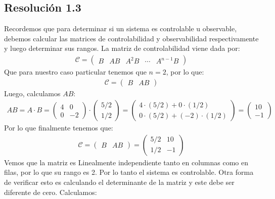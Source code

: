 \documentclass[
  11pt,
  letterpaper,
   addpoints,
   answers
  ]{exam}
\begin{document}
\begin{questions}
\begin{solution}
  \subsection*{Resolución 1.3}
Recordemos que para determinar si un sistema es controlable u observable, debemos calcular las matrices de controlabilidad y observabilidad respectivamente y luego determinar sus rangos. La matriz de controlabilidad viene dada por:
\begin{align}
  \mathcal C = \begin{pmatrix} B & AB & A^2B & \cdots & A^{n-1}B \end{pmatrix}
\end{align}
Que para nuestro caso particular tenemos que $n=2$, por lo que:
\begin{align}
  \mathcal C = \begin{pmatrix} B & AB \end{pmatrix}
\end{align}
Luego, calculamos $AB$:
\begin{align}
  AB = A \cdot B = \begin{pmatrix} 4 & 0 \\ 0 & -2 \end{pmatrix} \cdot \begin{pmatrix} 5/2 \\ 1/2 \end{pmatrix} = \begin{pmatrix} 4 \cdot (5/2) + 0 \cdot (1/2) \\ 0 \cdot (5/2) + (-2) \cdot (1/2) \end{pmatrix} = \begin{pmatrix} 10 \\ -1 \end{pmatrix}
\end{align}
Por lo que finalmente tenemos que:
\begin{align}
  \mathcal C = \begin{pmatrix} B & AB \end{pmatrix} = \begin{pmatrix} 5/2 & 10 \\ 1/2 & -1 \end{pmatrix}
\end{align}
Vemos que la matriz es Linealmente independiente tanto en columnas como en filas, por lo que su rango es 2. Por lo tanto el sistema es controlable. Otra forma de verificar esto es calculando el determinante de la matriz y este debe ser diferente de cero. Calculamos:
\begin{align}

\end{align}
\end{solution}
\end{questions}
\end{document}
